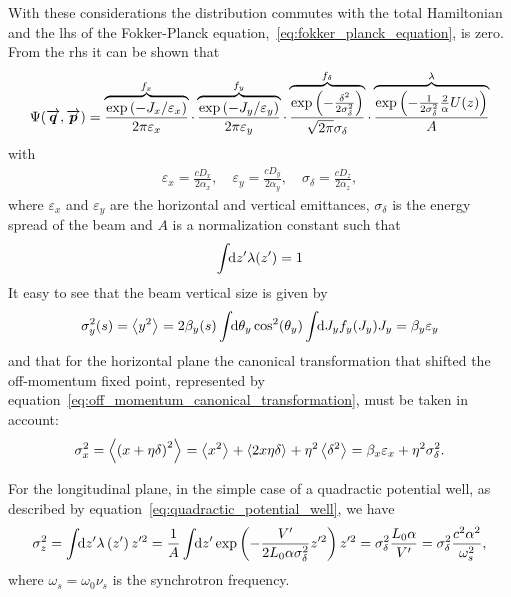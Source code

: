     With these considerations the distribution commutes with the total Hamiltonian and the \gls{lhs} of the Fokker-Planck equation,~\eqref{eq:fokker_planck_equation}, is zero. From the \gls{rhs} it can be shown that
    \begin{align}\label{eq:equilibrium_distribution}
        \Psi(\overrightarrow{\boldsymbol{q}},\overrightarrow{\boldsymbol{p}}) =
        \overbrace{
        \frac{\exp\left(-J_x/\varepsilon_x\right)}{2\pi\varepsilon_x}}^{f_x}\cdot
        \overbrace{
        \frac{\exp\left(-J_y/\varepsilon_y\right)}{2\pi\varepsilon_y}}^{f_y}\cdot
        \overbrace{
        \frac{\exp\left(-\frac{\delta^2}{2\sigma_\delta^2}\right)}{\sqrt{2\pi}\sigma_\delta}}^{f_\delta}\cdot
        \overbrace{
        \frac{\exp\left(-\frac{1}{2\sigma_\delta^2}\frac2\alpha U(z)\right)}{A}}^{\lambda}
    \end{align}
    with
    \begin{align}
        \varepsilon_x = \frac{cD_x}{2\alpha_x}, \quad
        \varepsilon_y = \frac{cD_y}{2\alpha_y}, \quad
        \sigma_\delta = \frac{cD_z}{2\alpha_z},
    \end{align}
    where $\varepsilon_x$ and $\varepsilon_y$ are the horizontal and vertical emittances, $\sigma_\delta$ is the energy spread of the beam and $A$ is a normalization constant such that
    \begin{align}
        \int\!\!\text{d}z' \lambda(z')=1
    \end{align}
    It easy to see that the beam vertical size is given by
    \begin{align}
        \sigma_y^2(s) = \left\langle y^2 \right\rangle_{{}} = 2\beta_y(s)\int\!\!\text{d}\theta_y \cos^2(\theta_y)\int\!\!\text{d}J_y f_y(J_y)J_y = \beta_y\varepsilon_y
    \end{align}
    and that for the horizontal plane the canonical transformation that shifted the off-momentum fixed point, represented by equation~\eqref{eq:off_momentum_canonical_transformation}, must be taken in account:
    \begin{align}
        \sigma_x^2 = \left\langle \left(x+\eta\delta\right)^2 \right\rangle_{{}} = \left\langle x^2 \right\rangle_{{}} + \left\langle 2x\eta\delta \right\rangle_{{}} + \eta^2\left\langle \delta^2 \right\rangle_{{}} = \beta_x\varepsilon_x + \eta^2\sigma_\delta^2.
    \end{align}

    For the longitudinal plane, in the simple case of a quadractic potential well, as described by equation~\eqref{eq:quadractic_potential_well}, we have
    \begin{align}
        \sigma_z^2 = \int\!\!\text{d}z' \lambda\left(z'\right)z'^2 =
        \frac1A\int\!\!\text{d}z' 
            \exp\left(-\frac{V'}{2L_0\alpha\sigma_\delta^2} z'^2\right)z'^2
        = \sigma_\delta^2\frac{L_0\alpha}{V'} = \sigma_\delta^2 \frac{c^2\alpha^2}{\omega_s^2},
    \end{align}
    where $\omega_s = \omega_0\nu_s$ is the synchrotron frequency.

